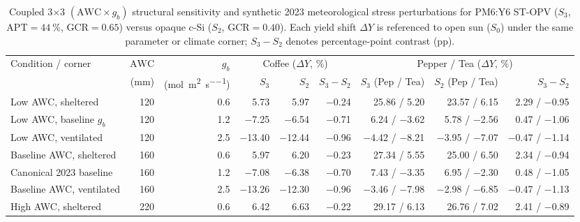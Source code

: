 \documentclass[preprint,12pt,a4paper]{elsarticle}
\begin{document}
\begin{table}[htbp]
\centering
\scriptsize
\setlength{\tabcolsep}{2.8pt}
\caption{Coupled \num{3}$\times$\num{3} $(\mathrm{AWC}\times g_b)$ structural sensitivity and synthetic 2023 meteorological stress perturbations for PM6:Y6 ST-OPV ($S_3$, $\mathrm{APT}=\qty{44}{\percent}$, $\mathrm{GCR}=\num{0.65}$) versus opaque c-Si ($S_2$, $\mathrm{GCR}=\num{0.40}$). Each yield shift $\Delta Y$ is referenced to open sun ($S_0$) under the same parameter or climate corner; $S_3-S_2$ denotes percentage-point contrast (\unit{pp}).}
\label{tab:sm_awc_gb_stress}
\begin{tabular}{@{}l r r rrr rrr@{}}
\toprule
Condition / corner & $\mathrm{AWC}$ & $g_b$ & \multicolumn{3}{c}{Coffee ($\Delta Y$, \unit{\percent})} & \multicolumn{3}{c}{Pepper / Tea ($\Delta Y$, \unit{\percent})} \\
\cmidrule(lr){4-6}\cmidrule(lr){7-9}
& (\unit{\milli\meter}) & (\unit{\mole\per\square\meter\per\second}) & $S_3$ & $S_2$ & $S_3-S_2$ & $S_3$ (Pep / Tea) & $S_2$ (Pep / Tea) & $S_3-S_2$ \\
\midrule
Low AWC, sheltered & \num{120} & \num{0.6} & \num{+5.73} & \num{+5.97} & \num{-0.24} & \num{+25.86} / \num{+5.20} & \num{+23.57} / \num{+6.15} & \num{+2.29} / \num{-0.95} \\
Low AWC, baseline $g_b$ & \num{120} & \num{1.2} & \num{-7.25} & \num{-6.54} & \num{-0.71} & \num{+6.24} / \num{-3.62} & \num{+5.78} / \num{-2.56} & \num{+0.47} / \num{-1.06} \\
Low AWC, ventilated & \num{120} & \num{2.5} & \num{-13.40} & \num{-12.44} & \num{-0.96} & \num{-4.42} / \num{-8.21} & \num{-3.95} / \num{-7.07} & \num{-0.47} / \num{-1.14} \\
Baseline AWC, sheltered & \num{160} & \num{0.6} & \num{+5.97} & \num{+6.20} & \num{-0.23} & \num{+27.34} / \num{+5.55} & \num{+25.00} / \num{+6.50} & \num{+2.34} / \num{-0.94} \\
Canonical 2023 baseline & \num{160} & \num{1.2} & \num{-7.08} & \num{-6.38} & \num{-0.70} & \num{+7.43} / \num{-3.35} & \num{+6.95} / \num{-2.30} & \num{+0.48} / \num{-1.05} \\
Baseline AWC, ventilated & \num{160} & \num{2.5} & \num{-13.26} & \num{-12.30} & \num{-0.96} & \num{-3.46} / \num{-7.98} & \num{-2.98} / \num{-6.85} & \num{-0.47} / \num{-1.13} \\
High AWC, sheltered & \num{220} & \num{0.6} & \num{+6.42} & \num{+6.63} & \num{-0.22} & \num{+29.17} / \num{+6.13} & \num{+26.76} / \num{+7.02} & \num{+2.41} / \num{-0.89} \\

\end{tabular}
\end{table}
\end{document}
